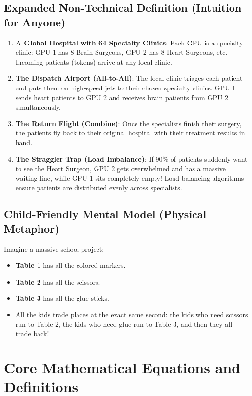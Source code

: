 \documentclass[11pt,a4paper]{article}
\theoremstyle{definition}
\begin{document}
\subsection{Expanded Non-Technical Definition (Intuition for Anyone)}
\begin{enumerate}
    \item \textbf{A Global Hospital with 64 Specialty Clinics}: Each GPU is a specialty clinic: GPU 1 has 8 Brain Surgeons, GPU 2 has 8 Heart Surgeons, etc. Incoming patients (tokens) arrive at any local clinic.
    \item \textbf{The Dispatch Airport (All-to-All)}: The local clinic triages each patient and puts them on high-speed jets to their chosen specialty clinics. GPU 1 sends heart patients to GPU 2 and receives brain patients from GPU 2 simultaneously.
    \item \textbf{The Return Flight (Combine)}: Once the specialists finish their surgery, the patients fly back to their original hospital with their treatment results in hand.
    \item \textbf{The Straggler Trap (Load Imbalance)}: If 90\% of patients suddenly want to see the Heart Surgeon, GPU 2 gets overwhelmed and has a massive waiting line, while GPU 1 sits completely empty! Load balancing algorithms ensure patients are distributed evenly across specialists.
\end{enumerate}

\subsection{Child-Friendly Mental Model (Physical Metaphor)}
Imagine a massive school project:
\begin{itemize}
    \item \textbf{Table 1} has all the colored markers.
    \item \textbf{Table 2} has all the scissors.
    \item \textbf{Table 3} has all the glue sticks.
    \item All the kids trade places at the exact same second: the kids who need scissors run to Table 2, the kids who need glue run to Table 3, and then they all trade back!
\end{itemize}

\section{Core Mathematical Equations and Definitions}
\end{document}

